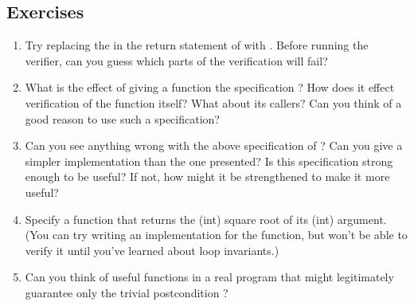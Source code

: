 \subsection*{Exercises}
\begin{enumerate}
\item
Try replacing the \vcc{<} in the return statement of  with
\vcc{>}. Before running the verifier, can you guess which parts of the
verification will fail?

\item
What is the effect of giving a function the specification
 ? How does it effect verification of
the function itself? What about its callers? Can you think of a good 
reason to use such a specification?


\item
Can you see anything wrong with the above specification of ?
Can you give a simpler implementation than the one presented? Is this 
specification strong enough to be useful? If not, how might it be
strengthened to make it more useful?

\item
Specify a function that returns the (int) square root of its (int)
argument. (You can try writing an implementation for the function, but
won't be able to verify it until you've learned about loop
invariants.)

\item
Can you think of useful functions in a real program that might
legitimately guarantee only the trivial postcondition ?
\end{enumerate}

